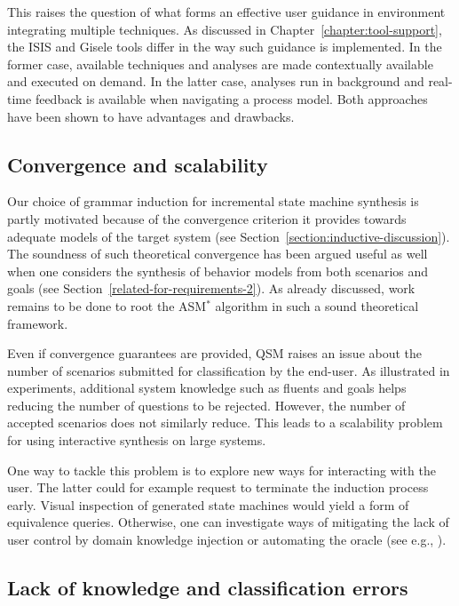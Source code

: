 This raises the question of what forms an effective user guidance in environment integrating multiple techniques. As discussed in Chapter~\ref{chapter:tool-support}, the ISIS and Gisele tools differ in the way such guidance is implemented. In the former case, available techniques and analyses are made contextually available and executed on demand. In the latter case, analyses run in background and real-time feedback is available when navigating a process model. Both approaches have been shown to have advantages and drawbacks.

\subsection*{Convergence and scalability}

Our choice of grammar induction for incremental state machine synthesis is partly motivated because of the convergence criterion it provides towards adequate models of the target system (see Section~\ref{section:inductive-discussion}). The soundness of such theoretical convergence has been argued useful as well when one considers the synthesis of behavior models from both scenarios and goals (see Section~\ref{related-for-requirements-2}). As already discussed, work remains to be done to root the ASM$^*$ algorithm in such a sound theoretical framework.

Even if convergence guarantees are provided, QSM raises an issue about the number of scenarios submitted for classification by the end-user. As illustrated in experiments, additional system knowledge such as fluents and goals helps reducing the number of questions to be rejected. However, the number of accepted scenarios does not similarly reduce. This leads to a scalability problem for using interactive synthesis on large systems.

One way to tackle this problem is to explore new ways for interacting with the user. The latter could for example request to terminate the induction process early. Visual inspection of generated state machines would yield a form of equivalence queries. Otherwise, one can investigate ways of mitigating the lack of user control by domain knowledge injection or automating the oracle (see e.g., \cite{Walkinshaw:2007}).

\subsection*{Lack of knowledge and classification errors}

